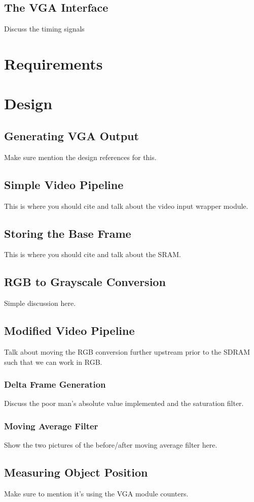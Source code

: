 \documentclass[11pt]{article} %
\begin{document}
\subsection{The VGA Interface}
Discuss the timing signals 
\section{Requirements}
\section{Design}
\subsection{Generating VGA Output}
Make sure mention the design references for this.
\subsection{Simple Video Pipeline}
This is where you should cite \cite{13} and talk about the video input wrapper module.
\subsection{Storing the Base Frame}
This is where you should cite \cite{14} and talk about the SRAM.
\subsection{RGB to Grayscale Conversion}
Simple discussion here.
\subsection{Modified Video Pipeline}
Talk about moving the RGB conversion further upstream prior to the SDRAM such that we can work in RGB.
\subsubsection{Delta Frame Generation}
Discuss the poor man's absolute value implemented and the saturation filter.
\subsubsection{Moving Average Filter}
Show the two pictures of the before/after moving average filter here.
\subsection{Measuring Object Position}
Make sure to mention it's using the VGA module counters.
\end{document}
